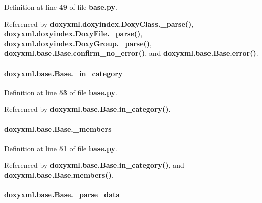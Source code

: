 Definition at line {\bf 49} of file {\bf base.\+py}.



Referenced by {\bf doxyxml.\+doxyindex.\+Doxy\+Class.\+\_\+parse()}, {\bf doxyxml.\+doxyindex.\+Doxy\+File.\+\_\+parse()}, {\bf doxyxml.\+doxyindex.\+Doxy\+Group.\+\_\+parse()}, {\bf doxyxml.\+base.\+Base.\+confirm\+\_\+no\+\_\+error()}, and {\bf doxyxml.\+base.\+Base.\+error()}.

\paragraph[{\+\_\+in\+\_\+category}]{\setlength{\rightskip}{0pt plus 5cm}doxyxml.\+base.\+Base.\+\_\+in\+\_\+category\hspace{0.3cm}{\ttfamily [private]}}\label{classdoxyxml_1_1base_1_1Base_af14d9cac69c606d0b4a2d250ef99ff2c}


Definition at line {\bf 53} of file {\bf base.\+py}.



Referenced by {\bf doxyxml.\+base.\+Base.\+in\+\_\+category()}.

\paragraph[{\+\_\+members}]{\setlength{\rightskip}{0pt plus 5cm}doxyxml.\+base.\+Base.\+\_\+members\hspace{0.3cm}{\ttfamily [private]}}\label{classdoxyxml_1_1base_1_1Base_a1d3565ed18149687aaa60fcd3cfa366e}


Definition at line {\bf 51} of file {\bf base.\+py}.



Referenced by {\bf doxyxml.\+base.\+Base.\+in\+\_\+category()}, and {\bf doxyxml.\+base.\+Base.\+members()}.

\paragraph[{\+\_\+parse\+\_\+data}]{\setlength{\rightskip}{0pt plus 5cm}doxyxml.\+base.\+Base.\+\_\+parse\+\_\+data\hspace{0.3cm}{\ttfamily [private]}}\label{classdoxyxml_1_1base_1_1Base_ae3ce9448c098763989dc8ffcc4f33a4d}


